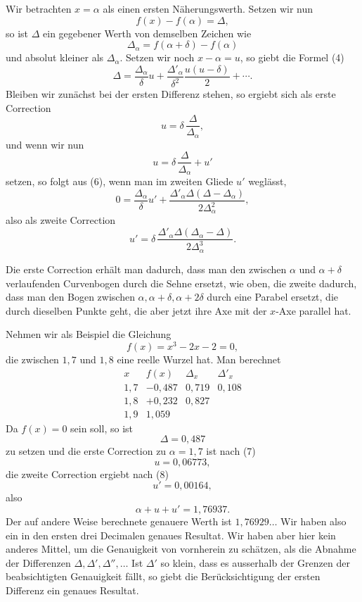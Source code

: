 \documentclass[11pt]{article}
\begin{document}
Wir betrachten $x=\alpha$ als einen ersten Näherungswerth. Setzen wir nun
\[
        f(x)-f(\alpha)=\Delta,
\]
so ist $\Delta$ ein gegebener Werth von demselben Zeichen wie
\[
        \Delta_\alpha=f(\alpha+\delta)-f(\alpha)
\]
und absolut kleiner als $\Delta_\alpha$. Setzen wir noch $x-\alpha=u$, so giebt die Formel (4)
\begin{equation}
        \Delta=\frac{\Delta_\alpha}{\delta}u+
        \frac{\Delta'_\alpha}{\delta^2}\frac{u(u-\delta)}2+\cdots .
\tag{6}
\end{equation}
Bleiben wir zunächst bei der ersten Differenz stehen, so ergiebt sich als erste Correction
\begin{equation}
        u=\delta\,\frac{\Delta}{\Delta_\alpha},
\tag{7}
\end{equation}
und wenn wir nun
\[
        u=\delta\,\frac{\Delta}{\Delta_\alpha}+u'
\]
setzen, so folgt aus (6), wenn man im zweiten Gliede $u'$ weglässt,
\[
        0=\frac{\Delta_\alpha}{\delta}u'
        +\frac{\Delta'_\alpha\Delta(\Delta-\Delta_\alpha)}
               {2\Delta_\alpha^2},
\]
also als zweite Correction
\begin{equation}
        u'=\delta\,\frac{\Delta'_\alpha\Delta(\Delta_\alpha-\Delta)}
                     {2\Delta_\alpha^3}.
\tag{8}
\end{equation}

Die erste Correction erhält man dadurch, dass man den zwischen $\alpha$ und $\alpha+\delta$ verlaufenden Curvenbogen durch die Sehne ersetzt, wie oben, die zweite dadurch, dass man den Bogen zwischen $\alpha,\alpha+\delta,\alpha+2\delta$ durch eine Parabel ersetzt, die durch dieselben Punkte geht, die aber jetzt ihre Axe mit der $x$-Axe parallel hat.

Nehmen wir als Beispiel die Gleichung
\[
        f(x)=x^3-2x-2=0,
\]
die zwischen $1{,}7$ und $1{,}8$ eine reelle Wurzel hat. Man berechnet
\[
\begin{array}{c|c|c|c}
x&f(x)&\Delta_x&\Delta'_x\\ \hline
1{,}7&-0{,}487&0{,}719&0{,}108\\
1{,}8&+0{,}232&0{,}827&\\
1{,}9&1{,}059&&
\end{array}
\]
Da $f(x)=0$ sein soll, so ist
\[
        \Delta=0{,}487
\]
zu setzen und die erste Correction zu $\alpha=1{,}7$ ist nach (7)
\[
        u=0{,}06773,
\]
die zweite Correction ergiebt nach (8)
\[
        u'=0{,}00164,
\]
also
\[
        \alpha+u+u'=1{,}76937.
\]
Der auf andere Weise berechnete genauere Werth ist $1{,}76929\ldots$ Wir haben also ein in den ersten drei Decimalen genaues Resultat. Wir haben aber hier kein anderes Mittel, um die Genauigkeit von vornherein zu schätzen, als die Abnahme der Differenzen $\Delta,\Delta',\Delta'',\ldots$ Ist $\Delta'$ so klein, dass es ausserhalb der Grenzen der beabsichtigten Genauigkeit fällt, so giebt die Berücksichtigung der ersten Differenz ein genaues Resultat.
\end{document}
